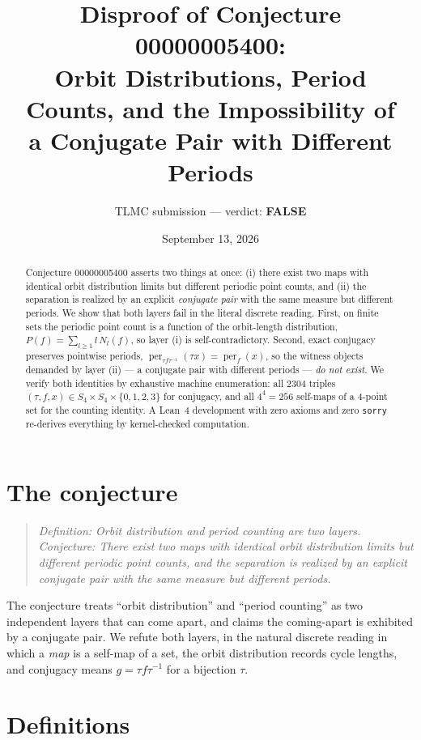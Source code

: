 \documentclass[11pt]{article}
\title{Disproof of Conjecture 00000005400:\\
Orbit Distributions, Period Counts, and the Impossibility of\\
a Conjugate Pair with Different Periods}
\author{TLMC submission --- verdict: \textbf{FALSE}}
\date{September 13, 2026}
\theoremstyle{definition}
\begin{document}
\maketitle

\begin{abstract}
Conjecture 00000005400 asserts two things at once: (i) there exist two maps with
identical orbit distribution limits but different periodic point counts, and
(ii) the separation is realized by an explicit \emph{conjugate pair} with the
same measure but different periods. We show that both layers fail in the literal
discrete reading. First, on finite sets the periodic point count is a function of
the orbit-length distribution, $P(f)=\sum_{l\ge1} l\,N_l(f)$, so layer (i) is
self-contradictory. Second, exact conjugacy preserves pointwise periods,
$\operatorname{per}_{\tau f\tau^{-1}}(\tau x)=\operatorname{per}_f(x)$, so the
witness objects demanded by layer (ii) --- a conjugate pair with different
periods --- \emph{do not exist}. We verify both identities by exhaustive machine
enumeration: all $2304$ triples $(\tau,f,x)\in S_4\times S_4\times\{0,1,2,3\}$
for conjugacy, and all $4^4=256$ self-maps of a $4$-point set for the counting
identity. A Lean~4 development with zero axioms and zero \texttt{sorry}
re-derives everything by kernel-checked computation.
\end{abstract}

\section{The conjecture}

\begin{quote}
\emph{Definition: Orbit distribution and period counting are two layers.
Conjecture: There exist two maps with identical orbit distribution limits but
different periodic point counts, and the separation is realized by an explicit
conjugate pair with the same measure but different periods.}
\end{quote}

The conjecture treats ``orbit distribution'' and ``period counting'' as two
independent layers that can come apart, and claims the coming-apart is exhibited
by a conjugate pair. We refute both layers, in the natural discrete reading in
which a \emph{map} is a self-map of a set, the orbit distribution records cycle
lengths, and conjugacy means $g=\tau f\tau^{-1}$ for a bijection $\tau$.

\section{Definitions}
\end{document}
